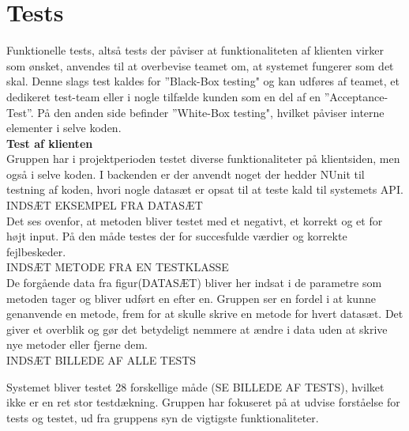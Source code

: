 \section{Tests}\label{sec:tests}
Funktionelle tests, altså tests der påviser at funktionaliteten af klienten virker som ønsket, 
anvendes til at overbevise teamet om, at systemet fungerer som det skal. 
Denne slags test kaldes for ”Black-Box testing" og kan udføres af teamet, 
et dedikeret test-team eller i nogle tilfælde kunden som en del af en ”Acceptance-Test”. 
På den anden side befinder ”White-Box testing", hvilket påviser interne elementer i selve koden. \\

\textbf{Test af klienten} \\
Gruppen har i projektperioden testet diverse funktionaliteter på klientsiden, 
men også i selve koden. I backenden er der anvendt noget der hedder NUnit til testning af koden, 
hvori nogle datasæt er opsat til at teste kald til systemets API.\\

INDSÆT EKSEMPEL FRA DATASÆT\\

Det ses ovenfor, at metoden bliver testet med et negativt, et korrekt og et for højt input. 
På den måde testes der for succesfulde værdier og korrekte fejlbeskeder. \\

INDSÆT METODE FRA EN TESTKLASSE\\

De forgående data fra figur(DATASÆT) bliver her indsat i de parametre som 
metoden tager og bliver udført en efter en. 
Gruppen ser en fordel i at kunne genanvende en metode, 
frem for at skulle skrive en metode for hvert datasæt. 
Det giver et overblik og gør det betydeligt nemmere at ændre i data uden at skrive nye metoder eller fjerne dem.\\

INDSÆT BILLEDE AF ALLE TESTS

Systemet bliver testet 28 forskellige måde (SE BILLEDE AF TESTS), hvilket ikke er en ret stor testdækning. 
Gruppen har fokuseret på at udvise forståelse for tests og testet, ud fra gruppens syn de vigtigste funktionaliteter.    